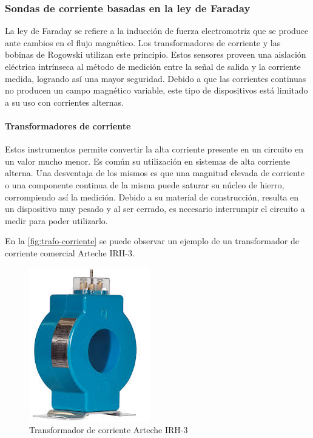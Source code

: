 \documentclass[../informe.tex]{subfiles}
\begin{document}
  \subsubsection{Sondas de corriente basadas en la ley de Faraday}
  La ley de Faraday se refiere a la inducción de fuerza electromotriz que se produce ante cambios en el flujo magnético. Los transformadores de corriente y las bobinas de Rogowski utilizan este principio. Estos sensores proveen una aislación eléctrica intrínseca al método de medición entre la señal de salida y la corriente medida, logrando así una mayor seguridad. Debido a que las corrientes continuas no producen un campo magnético variable, este tipo de dispositivos está limitado a su uso con corrientes alternas.

    \paragraph{Transformadores de corriente}
    Estos instrumentos permite convertir la alta corriente presente en un circuito en un valor mucho menor. Es común su utilización en sistemas de alta corriente alterna. Una desventaja de los mismos es que una magnitud elevada de corriente o una componente continua de la misma puede saturar su núcleo de hierro, corrompiendo así la medición. Debido a su material de construcción, resulta en un dispositivo muy pesado y al ser cerrado, es necesario interrumpir el circuito a medir para poder utilizarlo.

    En la \autoref{fig:trafo-corriente} se puede observar un ejemplo de un transformador de corriente comercial Arteche IRH-3.

        \begin{figure}[!htbp]
            \centering
            \includegraphics[scale=0.5]{images/trafo-corriente.jpg}
            \caption{Transformador de corriente Arteche IRH-3}
            \label{fig:trafo-corriente}
        \end{figure}
\end{document}
